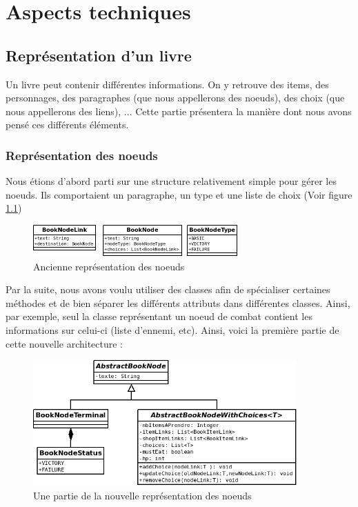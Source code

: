 \chapter{Aspects techniques}

	\section{Représentation d'un livre}
		\label{sec:representation_livre}

		Un livre peut contenir différentes informations. On y retrouve des items, des personnages, des paragraphes (que nous appellerons des noeuds), des choix (que nous appellerons des liens), ... Cette partie présentera la manière dont nous avons pensé ces différents éléments.

		\subsection{Représentation des noeuds}

			Nous étions d'abord parti sur une structure relativement simple pour gérer les noeuds. Ils comportaient un paragraphe, un type et une liste de choix (Voir figure \ref{fig:OldBookNode})

			\begin{figure}[H]
				\centering\includegraphics[width=0.70\textwidth, keepaspectratio]{img/BookNodeBefore.png}
				\caption{Ancienne représentation des noeuds}
				\label{fig:OldBookNode}
			\end{figure}

			Par la suite, nous avons voulu utiliser des classes afin de spécialiser certaines méthodes et de bien séparer les différents attributs dans différentes classes. Ainsi, par exemple, seul la classe représentant un noeud de combat contient les informations sur celui-ci (liste d'ennemi, etc). Ainsi, voici la première partie de cette nouvelle architecture :

			\begin{figure}[H]
				\centering\includegraphics[width=0.90\textwidth, keepaspectratio]{img/BookNode1.png}
				\caption{Une partie de la nouvelle représentation des noeuds}
				\label{fig:BookNode1}
			\end{figure}

